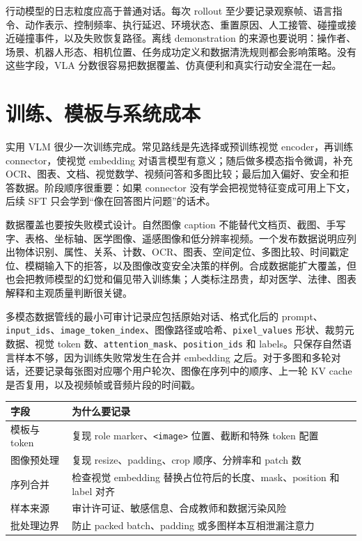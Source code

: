 \documentclass[UTF8,zihao=-4,openany]{ctexbook}
\begin{document}
行动模型的日志粒度应高于普通对话。每次 rollout 至少要记录观察帧、语言指令、动作表示、控制频率、执行延迟、环境状态、重置原因、人工接管、碰撞或接近碰撞事件，以及失败恢复路径。离线 demonstration 的来源也要说明：操作者、场景、机器人形态、相机位置、任务成功定义和数据清洗规则都会影响策略。没有这些字段，VLA 分数很容易把数据覆盖、仿真便利和真实行动安全混在一起。

\section{训练、模板与系统成本}
实用 VLM 很少一次训练完成。常见路线是先选择或预训练视觉 encoder，再训练 connector，使视觉 embedding 对语言模型有意义；随后做多模态指令微调，补充 OCR、图表、文档、视觉数学、视频问答和多图比较；最后加入偏好、安全和拒答数据。阶段顺序很重要：如果 connector 没有学会把视觉特征变成可用上下文，后续 SFT 只会学到“像在回答图片问题”的话术。

数据覆盖也要按失败模式设计。自然图像 caption 不能替代文档页、截图、手写字、表格、坐标轴、医学图像、遥感图像和低分辨率视频。一个发布数据说明应列出物体识别、属性、关系、计数、OCR、图表、空间定位、多图比较、时间戳定位、模糊输入下的拒答，以及图像改变安全决策的样例。合成数据能扩大覆盖，但也会把教师模型的幻觉和偏见带入训练集；人类标注昂贵，却对医学、法律、图表解释和主观质量判断很关键。

多模态数据管线的最小可审计记录应包括原始对话、格式化后的 prompt、\texttt{input\_ids}、\texttt{image\_token\_index}、图像路径或哈希、\texttt{pixel\_values} 形状、裁剪元数据、视觉 token 数、\texttt{attention\_mask}、\texttt{position\_ids} 和 labels。只保存自然语言样本不够，因为训练失败常发生在合并 embedding 之后。对于多图和多轮对话，还要记录每张图对应哪个用户轮次、图像在序列中的顺序、上一轮 KV cache 是否复用，以及视频帧或音频片段的时间戳。

\begin{center}
\begin{tabular}{p{}p{}}
\toprule
字段 & 为什么要记录 \\
\midrule
模板与 token & 复现 role marker、\texttt{<image>} 位置、截断和特殊 token 配置 \\
图像预处理 & 复现 resize、padding、crop 顺序、分辨率和 patch 数 \\
序列合并 & 检查视觉 embedding 替换占位符后的长度、mask、position 和 label 对齐 \\
样本来源 & 审计许可证、敏感信息、合成教师和数据污染风险 \\
批处理边界 & 防止 packed batch、padding 或多图样本互相泄漏注意力 \\
\bottomrule
\end{tabular}
\end{center}
\end{document}
